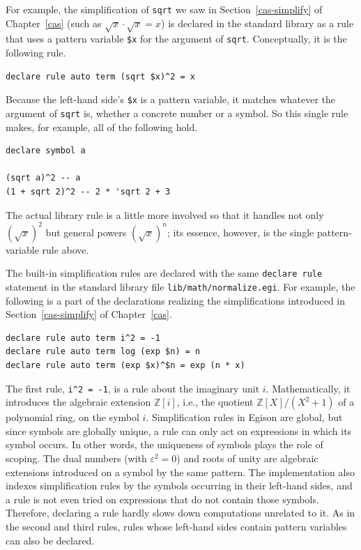 For example, the simplification of \lstinline{sqrt} we saw in Section~\ref{cas-simplify} of Chapter~\ref{cas} (such as $\sqrt{x} \cdot \sqrt{x} = x$) is declared in the standard library as a rule that uses a pattern variable \lstinline{$x} for the argument of \lstinline{sqrt}.
Conceptually, it is the following rule.
\begin{lstlisting}[language=egison,numbers=none]
declare rule auto term (sqrt $x)^2 = x
\end{lstlisting}
Because the left-hand side's \lstinline{$x} is a pattern variable, it matches whatever the argument of \lstinline{sqrt} is, whether a concrete number or a symbol.
So this single rule makes, for example, all of the following hold.
\begin{lstlisting}[language=egison,numbers=none]
declare symbol a

(sqrt a)^2 -- a
(1 + sqrt 2)^2 -- 2 * 'sqrt 2 + 3
\end{lstlisting}
The actual library rule is a little more involved so that it handles not only $(\sqrt{x})^2$ but general powers $(\sqrt{x})^n$; its essence, however, is the single pattern-variable rule above.

The built-in simplification rules are declared with the same \lstinline{declare rule} statement in the standard library file \texttt{lib/math/normalize.egi}.
For example, the following is a part of the declarations realizing the simplifications introduced in Section~\ref{cas-simplify} of Chapter~\ref{cas}.
\begin{lstlisting}[language=egison,numbers=none]
declare rule auto term i^2 = -1
declare rule auto term log (exp $n) = n
declare rule auto term (exp $x)^$n = exp (n * x)
\end{lstlisting}
The first rule, \lstinline{i^2 = -1}, is a rule about the imaginary unit $i$.
Mathematically, it introduces the algebraic extension $\mathbb{Z}[i]$, i.e., the quotient $\mathbb{Z}[X]/(X^2+1)$ of a polynomial ring, on the symbol $i$.
Simplification rules in Egison are global, but since symbols are globally unique, a rule can only act on expressions in which its symbol occurs.
In other words, the uniqueness of symbols plays the role of scoping.
The dual numbers (with $\varepsilon^2 = 0$) and roots of unity are algebraic extensions introduced on a symbol by the same pattern.
The implementation also indexes simplification rules by the symbols occurring in their left-hand sides, and a rule is not even tried on expressions that do not contain those symbols.
Therefore, declaring a rule hardly slows down computations unrelated to it.
As in the second and third rules, rules whose left-hand sides contain pattern variables can also be declared.

